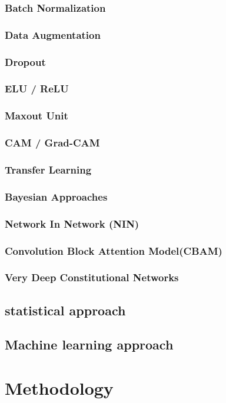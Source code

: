 \documentclass[acmsmall, review]{acmart}
\begin{document}
\subsubsection{Batch Normalization}
\subsubsection{Data Augmentation}
\subsubsection{Dropout}
\subsubsection{ELU / ReLU}
\subsubsection{Maxout Unit}
\subsubsection{CAM / Grad-CAM}
\subsubsection{Transfer Learning}
\subsubsection{Bayesian Approaches}
\subsubsection{Network In Network (NIN)}
\subsubsection{Convolution Block Attention Model(CBAM)}
\subsubsection{Very Deep Constitutional Networks}
\subsection{statistical approach}
\subsection{Machine learning approach}


\section{Methodology}
\end{document}
